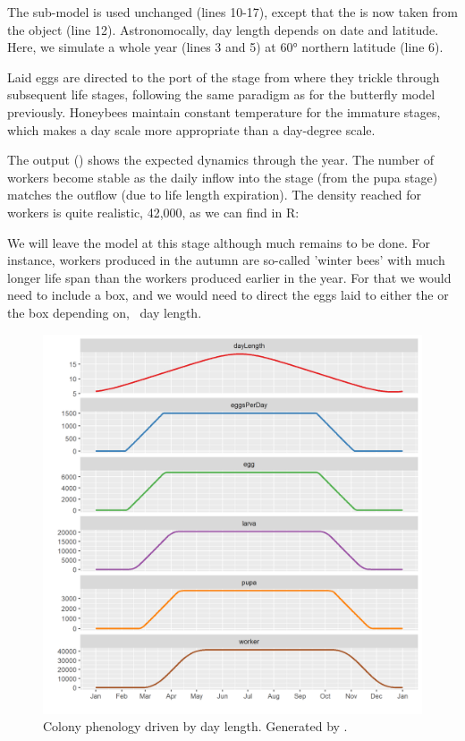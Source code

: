 The  sub-model is used unchanged (lines 10-17), except that the  is now taken from the  object (line 12). Astronomocally, day length depends on date and latitude. Here, we simulate a whole year (lines 3 and 5) at \ang{60} northern latitude (line 6).

Laid eggs are directed to the  port of the  stage from where they trickle through subsequent life stages, following the same paradigm as for the butterfly model previously. Honeybees maintain constant temperature for the immature stages, which makes a day scale more appropriate than a day-degree scale.

The output () shows the expected dynamics through the year. The number of workers become stable as the daily inflow into the stage (from the pupa stage) matches the outflow (due to life length expiration). The density reached for workers is quite realistic, 42,000, as we can find in R:


We will leave the model at this stage although much remains to be done. For instance, workers produced in the autumn are so-called 'winter bees' with much longer life span than the workers produced earlier in the year. For that we would need to include a  box, and we would need to direct the eggs laid to either the  or the  box depending on, \eg\ day length.


\begin{figure}
\centering
\includegraphics[width=\textwidth]{graphics/honeybee2}
\caption{Colony phenology driven by day length. Generated by .}
\label{fig:honeybee2}
\end{figure}
